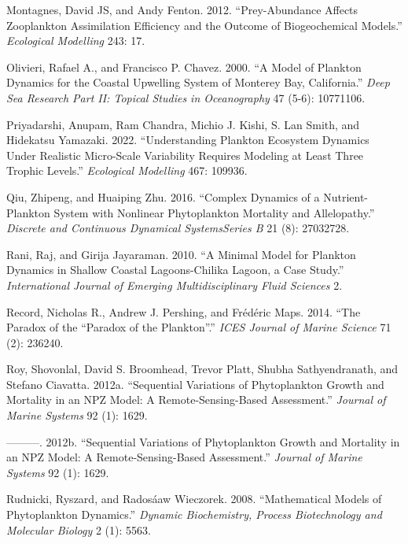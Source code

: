 \documentclass[
  letterpaper,
  DIV=11,
  numbers=noendperiod]{scrartcl}
\newlength{\cslhangindent}
\newlength{\cslentryspacingunit} %
\newenvironment{CSLReferences}[2] %
 {%
  \setlength{\parindent}{0pt}
  \ifodd #1
  \let\oldpar\par
  \def\par{\hangindent=\cslhangindent\oldpar}
  \fi
  \setlength{\parskip}{#2\cslentryspacingunit}
 }%
 {}
\begin{document}
\begin{CSLReferences}{1}{0}
\leavevmode{}%
Montagnes, David JS, and Andy Fenton. 2012. {``Prey-Abundance Affects
Zooplankton Assimilation Efficiency and the Outcome of Biogeochemical
Models.''} \emph{Ecological Modelling} 243: 17.

\leavevmode{}%
Olivieri, Rafael A., and Francisco P. Chavez. 2000. {``A Model of
Plankton Dynamics for the Coastal Upwelling System of Monterey Bay,
California.''} \emph{Deep Sea Research Part II: Topical Studies in
Oceanography} 47 (5-6): 10771106.

\leavevmode{}%
Priyadarshi, Anupam, Ram Chandra, Michio J. Kishi, S. Lan Smith, and
Hidekatsu Yamazaki. 2022. {``Understanding Plankton Ecosystem Dynamics
Under Realistic Micro-Scale Variability Requires Modeling at Least Three
Trophic Levels.''} \emph{Ecological Modelling} 467: 109936.

\leavevmode{}%
Qiu, Zhipeng, and Huaiping Zhu. 2016. {``Complex Dynamics of a
Nutrient-Plankton System with Nonlinear Phytoplankton Mortality and
Allelopathy.''} \emph{Discrete and Continuous Dynamical
Systems{\textemdash}Series B} 21 (8): 27032728.

\leavevmode{}%
Rani, Raj, and Girija Jayaraman. 2010. {``A Minimal Model for Plankton
Dynamics in Shallow Coastal Lagoons-Chilika Lagoon, a Case Study.''}
\emph{International Journal of Emerging Multidisciplinary Fluid
Sciences} 2.

\leavevmode{}%
Record, Nicholas R., Andrew J. Pershing, and Frédéric Maps. 2014. {``The
Paradox of the {``}Paradox of the Plankton{''}.''} \emph{ICES Journal of
Marine Science} 71 (2): 236240.

\leavevmode{}%
Roy, Shovonlal, David S. Broomhead, Trevor Platt, Shubha Sathyendranath,
and Stefano Ciavatta. 2012a. {``Sequential Variations of Phytoplankton
Growth and Mortality in an NPZ Model: A Remote-Sensing-Based
Assessment.''} \emph{Journal of Marine Systems} 92 (1): 1629.

\leavevmode{}%
---------. 2012b. {``Sequential Variations of Phytoplankton Growth and
Mortality in an NPZ Model: A Remote-Sensing-Based Assessment.''}
\emph{Journal of Marine Systems} 92 (1): 1629.

\leavevmode{}%
Rudnicki, Ryszard, and Radosáaw Wieczorek. 2008. {``Mathematical Models
of Phytoplankton Dynamics.''} \emph{Dynamic Biochemistry, Process
Biotechnology and Molecular Biology} 2 (1): 5563.


\end{CSLReferences}
\end{document}
